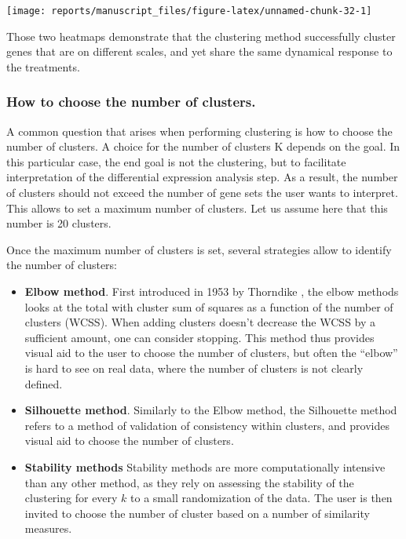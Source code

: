 \documentclass[9pt,a4paper,]{extarticle}
\begin{document}
\begin{center}\texttt{[image: reports/manuscript\_files/figure-latex/unnamed-chunk-32-1]} \end{center}

Those two heatmaps demonstrate that the clustering method successfully cluster
genes that are on different scales, and yet share the same dynamical response
to the treatments.

\hypertarget{how-to-choose-the-number-of-clusters.}{%
\subsubsection{How to choose the number of clusters.}\label{how-to-choose-the-number-of-clusters.}}

A common question that arises when performing clustering is how to choose the
number of clusters. A choice for the number of clusters K depends on the goal.
In this particular case, the end goal is not the clustering, but to facilitate
interpretation of the differential expression analysis step. As a result, the
number of clusters should not exceed the number of gene sets the user wants to
interpret. This allows to set a maximum number of clusters. Let us assume here
that this number is 20 clusters.

Once the maximum number of clusters is set, several strategies allow to
identify the number of clusters:

\begin{itemize}
\tightlist
\item
  \textbf{Elbow method}. First introduced in 1953 by Thorndike \citep{thorndike:who},
  the elbow methods looks at the total with cluster sum of squares
  as a function of the number of clusters (WCSS). When adding clusters
  doesn't decrease the WCSS by a sufficient
  amount, one can consider stopping. This method thus provides visual aid to
  the user to choose the number of clusters, but often the ``elbow'' is hard to
  see on real data, where the number of clusters is not clearly defined.
\item
  \textbf{Silhouette method}. Similarly to the Elbow method, the Silhouette method
  refers to a method of validation of consistency within clusters, and
  provides visual aid to choose the number of clusters.
\item
  \textbf{Stability methods} Stability methods are more computationally intensive
  than any other method, as they rely on assessing the stability of the
  clustering for every \(k\) to a small randomization of the data. The user is
  then invited to choose the number of cluster based on a number of similarity
  measures.
\end{itemize}
\end{document}
